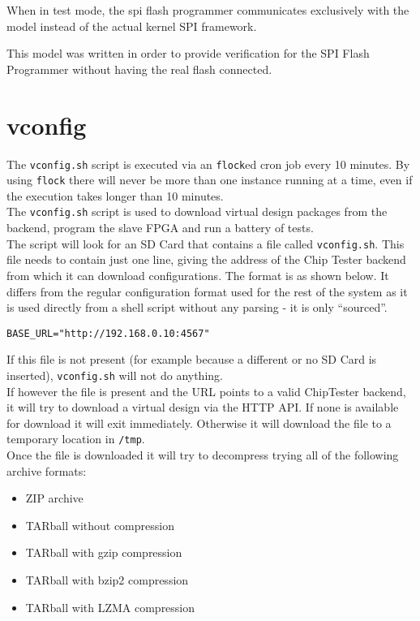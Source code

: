 When in test mode, the spi flash programmer communicates exclusively with the model
instead of the actual kernel SPI framework.

This model was written in order to provide verification for the SPI Flash Programmer
without having the real flash connected.


\newpage
\section{vconfig}
The \texttt{vconfig.sh} script is executed via an \texttt{flock}ed cron job every 10 minutes.
By using \texttt{flock} there will never be more than one instance running at a time, even if
the execution takes longer than 10 minutes.
\\

The \texttt{vconfig.sh} script is used to download virtual design packages from the
backend, program the slave FPGA and run a battery of tests.
\\

The script will look for an SD Card that contains a file called \texttt{vconfig.sh}. This
file needs to contain just one line, giving the address of the Chip Tester backend from
which it can download configurations. The format is as shown below. It differs from the
regular configuration format used for the rest of the system as it is used directly from
a shell script without any parsing - it is only ``sourced''.
\lstset{basicstyle=\scriptsize\ttfamily}
\begin{lstlisting}
BASE_URL="http://192.168.0.10:4567"
\end{lstlisting}

If this file is not present (for example because a different or no SD Card is inserted),
\texttt{vconfig.sh} will not do anything.
\\

If however the file is present and the URL points to a valid ChipTester backend, it will
try to download a virtual design via the HTTP API. If none is available for download it
will exit immediately. Otherwise it will download the file to a temporary location in \texttt{/tmp}.
\\

Once the file is downloaded it will try to decompress trying all of the following archive formats:
\begin{itemize}
 \item ZIP archive
 \item TARball without compression
 \item TARball with gzip compression
 \item TARball with bzip2 compression
 \item TARball with LZMA compression
\end{itemize}

